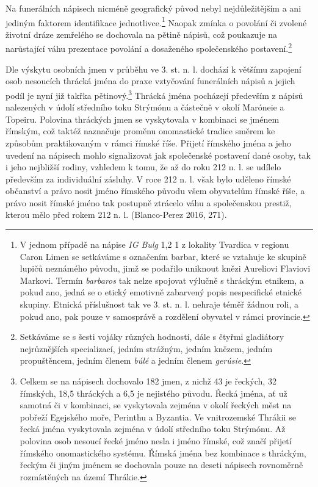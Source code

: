 Na funerálních nápisech nicméně geografický původ nebyl nejdůležitějším a ani jediným faktorem identifikace jednotlivce.\footnote{V jednom případě na nápise {\em IG Bulg} 1,2 1 z lokality Tvardica v regionu Caron Limen se setkáváme s označením barbar, které se vztahuje ke skupině lupičů neznámého původu, jimž se podařilo uniknout knězi Aureliovi Flaviovi Markovi. Termín {\em barbaros} tak nelze spojovat výlučně s thráckým etnikem, a pokud ano, jedná se o etický emotivně zabarvený popis nespecifické etnické skupiny. Etnická příslušnost tak ve 3. st. n. l. nehraje téměř žádnou roli, a pokud ano, pak pouze v samosprávě a rozdělení obyvatel v rámci provincie.} Naopak zmínka o povolání či zvolené životní dráze zemřelého se dochovala na pětině nápisů, což poukazuje na narůstající váhu prezentace povolání a dosaženého společenského postavení.\footnote{Setkáváme se s šesti vojáky různých hodností, dále s čtyřmi gladiátory nejrůznějších specializací, jedním strážným, jedním knězem, jedním propuštěncem, jedním členem {\em búlé} a jedním členem {\em gerúsie}.}

Dle výskytu osobních jmen v průběhu ve 3. st. n. l. dochází k většímu zapojení osob nesoucích thrácká jména do praxe vztyčování funerálních nápisů a jejich podíl je nyní již takřka pětinový.\footnote{Celkem se na nápisech dochovalo 182 jmen, z nichž 43  je řeckých, 32  římských, 18,5  thráckých a 6,5  je nejistého původu. Řecká jména, ať už samotná či v kombinaci, se vyskytovala zejména v okolí řeckých měst na pobřeží Egejského moře, Perinthu a Byzantia. Ve vnitrozemské Thrákii se řecká jména vyskytovala zejména v údolí středního toku Strýmónu. Až polovina osob nesoucí řecké jméno nesla i jméno římské, což značí přijetí římského onomastického systému. Římská jména bez kombinace s thráckým, řeckým či jiným jménem se dochovala pouze na deseti nápisech rovnoměrně rozmístěných na území Thrákie.} Thrácká jména pocházejí především z nápisů nalezených v údolí středního toku Strýmónu a částečně v okolí Maróneie a Topeiru. Polovina thráckých jmen se vyskytovala v kombinaci se jménem římským, což taktéž naznačuje proměnu onomastické tradice směrem ke způsobům praktikovaným v rámci římské říše. Přijetí římského jména a jeho uvedení na nápisech mohlo signalizovat jak společenské postavení dané osoby, tak i jeho nejbližší rodiny, vzhledem k tomu, že až do roku 212 n. l. se udílelo především za individuální zásluhy. V roce 212 n. l. však bylo uděleno římské občanství a právo nosit jméno římského původu všem obyvatelům římské říše, a právo nosit římské jméno tak postupně ztrácelo váhu a společenskou prestiž, kterou mělo před rokem 212 n. l. (Blanco-Perez 2016, 271).

